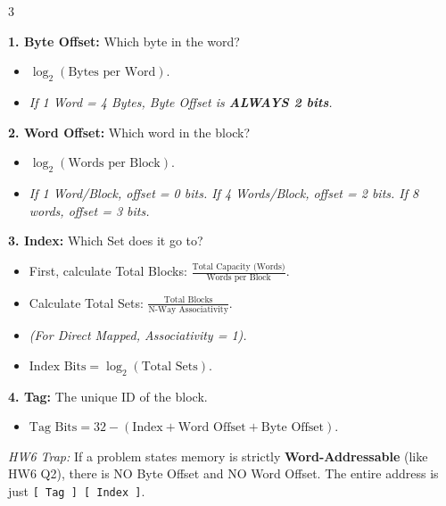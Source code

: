 \documentclass[8pt, letterpaper]{extarticle}
\begin{document}
\begin{multicols}{3}
\begin{tcolorbox}[colback=blue!5, colframe=blue!75!black, boxrule=0.5pt, title=\textbf{Cache Address Subdivision (HW6 Math)}]
\textbf{1. Byte Offset:} Which byte in the word?
\begin{itemize}
    \item $\log_2(\text{Bytes per Word})$.
    \item \textit{If 1 Word = 4 Bytes, Byte Offset is \textbf{ALWAYS 2 bits}.}
\end{itemize}
\textbf{2. Word Offset:} Which word in the block?
\begin{itemize}
    \item $\log_2(\text{Words per Block})$.
    \item \textit{If 1 Word/Block, offset = 0 bits. If 4 Words/Block, offset = 2 bits. If 8 words, offset = 3 bits.}
\end{itemize}
\textbf{3. Index:} Which Set does it go to?
\begin{itemize}
    \item First, calculate Total Blocks: $\frac{\text{Total Capacity (Words)}}{\text{Words per Block}}$.
    \item Calculate Total Sets: $\frac{\text{Total Blocks}}{\text{N-Way Associativity}}$. 
    \item \textit{(For Direct Mapped, Associativity = 1).}
    \item $\text{Index Bits} = \log_2(\text{Total Sets})$.
\end{itemize}
\textbf{4. Tag:} The unique ID of the block.
\begin{itemize}
    \item $\text{Tag Bits} = 32 - (\text{Index} + \text{Word Offset} + \text{Byte Offset})$.
\end{itemize}
\textit{HW6 Trap:} If a problem states memory is strictly \textbf{Word-Addressable} (like HW6 Q2), there is NO Byte Offset and NO Word Offset. The entire address is just \texttt{[ Tag ] [ Index ]}.
\end{tcolorbox}



\end{multicols}
\end{document}
